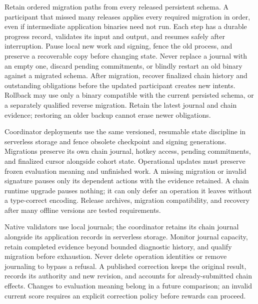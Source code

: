 Retain ordered migration paths from every released persistent schema. A
participant that missed many releases applies every required migration in
order, even if intermediate application binaries need not run. Each step has a
durable progress record, validates its input and output, and resumes safely
after interruption.
Pause local new work and signing, fence the old process, and preserve a recoverable
copy before changing state. Never replace a journal with an empty one, discard
pending commitments, or blindly restart an old binary against a migrated schema.
After migration, recover finalized chain history and outstanding obligations
before the updated participant creates new intents.
Rollback may use only a binary compatible with the current persisted schema,
or a separately qualified reverse migration. Retain the latest journal and
chain evidence; restoring an older backup cannot erase newer obligations.

Coordinator deployments use the same versioned, resumable state discipline in
serverless storage and fence obsolete checkpoint and signing generations.
Migrations preserve its own chain journal, hotkey access, pending commitments,
and finalized cursor alongside cohort state. Operational
updates must preserve frozen evaluation meaning and unfinished work. A missing
migration or invalid signature pauses only its dependent actions with the
evidence retained. A chain runtime upgrade pauses nothing; it can only defer an
operation it leaves without a type-correct encoding. Release archives, migration
compatibility, and recovery after many offline versions are tested requirements.

Native validators use local journals; the coordinator retains its chain journal
alongside its application records in serverless storage. Monitor journal
capacity, retain completed evidence beyond bounded diagnostic history,
and qualify migration before exhaustion. Never delete operation identities or
remove journaling to bypass a refusal. A published correction keeps the
original result, records its authority and new revision, and accounts for
already-submitted chain effects. Changes to evaluation meaning belong in a
future comparison; an invalid current score requires an explicit correction
policy before rewards can proceed.
